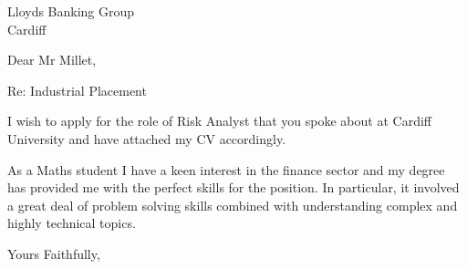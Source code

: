 \documentclass{letter}
\begin{document}
\begin{letter}
{Lloyds Banking Group \\ Cardiff}
\opening{Dear Mr Millet,}

Re: Industrial Placement

I wish to apply for the role of Risk Analyst that you spoke about at Cardiff University and have attached my CV accordingly.

As a Maths student I have a keen interest in the finance sector and my degree has provided me with the perfect skills for the position.
In particular, it involved a great deal of problem solving skills combined with understanding complex and highly technical topics.

\closing{Yours Faithfully,}


\end{letter}
\end{document}
